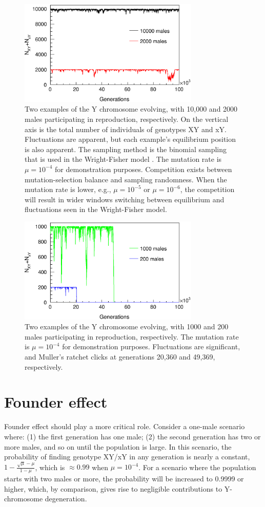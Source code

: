 \documentclass[referee,sn-basic]{sn-jnl}%
\theoremstyle{thmstyleone}%
\theoremstyle{thmstyletwo}%
\theoremstyle{thmstylethree}%
\begin{document}
\begin{figure}
      \includegraphics[width=8.6cm]{Fig3.eps}
      \caption{
Two examples of the Y chromosome evolving, with 10,000 and 2000 males participating in reproduction, respectively. On the vertical axis is the total number of individuals of genotypes XY and xY. Fluctuations are apparent, but each example's equilibrium position is also apparent. The sampling method is the binomial sampling that is used in the Wright-Fisher model \citep{Muirhead2016}. The mutation rate is $\mu=10^{-4}$ for demonstration purposes. 
Competition exists between mutation-selection balance and sampling randomness. When the mutation rate is lower, e.g., $\mu=10^{-5}$ or $\mu=10^{-6}$, the competition will result in wider windows switching between equilibrium and fluctuations seen in the Wright-Fisher model.
}\label{figure9}
\end{figure}

\begin{figure}
      \includegraphics[width=8.6cm]{Fig4.eps}
      \caption{
Two examples of the Y chromosome evolving, with 1000 and 200 males participating in reproduction, respectively. The mutation rate is $\mu=10^{-4}$ for demonstration purposes. Fluctuations are significant, and Muller's ratchet clicks at generations 20,360 and 49,369, respectively.
}\label{figure7}
\end{figure}


\section{Founder effect}
Founder effect \citep{templeton1980theory,provine2004ernst,joly2011existence} should play a more critical role. Consider a one-male scenario where: (1) the first generation has one male; (2) the second generation has two or more males, and so on until the population is large. In this scenario, the probability of finding genotype XY/xY in any generation is nearly a constant, $1-\frac{\sqrt{\mu}-\mu}{1-\mu}$, which is $\approx 0.99$ when $\mu=10^{-4}$. For a scenario where the population starts with two males or more, the probability will be increased to 0.9999 or higher, which, by comparison, gives rise to negligible contributions to Y-chromosome degeneration. 
\end{document}

